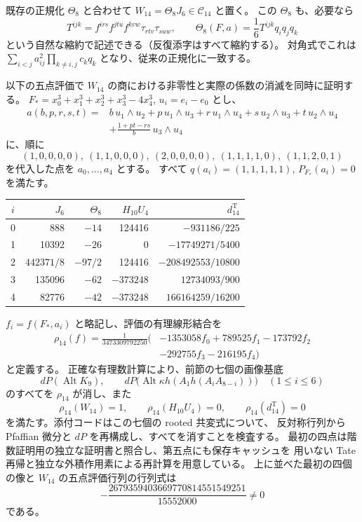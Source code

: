 \documentclass[a4paper,11pt]{ltjsarticle}
\theoremstyle{definition}
\begin{document}
既存の正規化 \(\Theta_8\) と合わせて
\(W_{14}=\Theta_8J_6\in\mathcal C_{14}\) と置く。
この \(\Theta_8\) も、必要なら
\[
 T^{ijk}=f^{irs}f^{jtu}f^{kvw}\tau_{rtv}\tau_{suw},\qquad
 \Theta_8(F,a)=\frac16 T^{ijk}q_iq_jq_k
\]
という自然な縮約で記述できる（反復添字はすべて縮約する）。
対角式でこれは
\(\sum_{i<j}a_{ij}^2\prod_{k\ne i,j}c_kq_k\) となり、従来の正規化に一致する。

以下の五点評価で \(W_{14}\) の商における非零性と実際の係数の消滅を同時に証明する。
\(F_*=x_0^3+x_1^3+x_2^3+x_3^3-4x_4^3\), \(u_i=e_i-e_0\) とし、
\[
\begin{split}
 a(b,p,r,s,t)={}&b\,u_1\wedge u_2+p\,u_1\wedge u_3
       +r\,u_1\wedge u_4+s\,u_2\wedge u_3+t\,u_2\wedge u_4\\
 &+\frac{1+pt-rs}{b}\,u_3\wedge u_4
\end{split}
\]
に、順に
\[
 (1,0,0,0,0),\ (1,1,0,0,0),\ (2,0,0,0,0),\
 (1,1,1,1,0),\ (1,1,2,0,1)
\]
を代入した点を \(a_0,\ldots,a_4\) とする。
すべて \(q(a_i)=(1,1,1,1,1)\), \(P_{F_*}(a_i)=0\) を満たす。
\begin{center}
\begin{tabular}{c|r|r|r|r}
\(i\)&\(J_6\)&\(\Theta_8\)&\(H_{10}U_4\)&\(d^{\mathrm T}_{14}\)\\\hline
0&888&\(-14\)&124416&\(-931186/225\)\\
1&10392&\(-26\)&0&\(-17749271/5400\)\\
2&\(442371/8\)&\(-97/2\)&124416&\(-208492553/10800\)\\
3&135096&\(-62\)&\(-373248\)&\(12734093/900\)\\
4&82776&\(-42\)&\(-373248\)&\(166164259/16200\)
\end{tabular}
\end{center}
\(f_i=f(F_*,a_i)\) と略記し、評価の有理線形結合を
\begin{equation}\label{eq:v11-rho-fourteen}
 \begin{split}
 \rho_{14}(f)=\frac{1}{3473309792250}\bigl(&-1353058 f_0+789525 f_1
                  -173792 f_2\\
                  &-292755 f_3-216195 f_4\bigr)
 \end{split}
\end{equation}
と定義する。
正確な有理数計算により、前節の七個の画像基底
\[
 dP(\operatorname{Alt}K_9),\qquad
 dP\bigl(\operatorname{Alt}\kappa h(A_1h(A_iA_{8-i}))\bigr)
 \quad(1\leq i\leq6)
\]
のすべてを \(\rho_{14}\) が消し、また
\begin{equation}\label{eq:v11-rho-fourteen-values}
 \rho_{14}(W_{14})=1,\qquad
 \rho_{14}(H_{10}U_4)=0,\qquad
 \rho_{14}(d^{\mathrm T}_{14})=0
\end{equation}
を満たす。添付コードはこの七個の rooted 共変式について、
反対称行列から Pfaffian 微分と \(dP\) を再構成し、すべてを消すことを検査する。
最初の四点は階数証明用の独立な証明書と照合し、第五点にも保存キャッシュを
用いない Tate 再帰と独立な外積作用素による再計算を用意している。
上に並べた最初の四個の像と \(W_{14}\) の五点評価行列の行列式は
\[
 -\frac{2679359403669770814551549251}{15552000}\ne0
\]
である。
\end{document}
